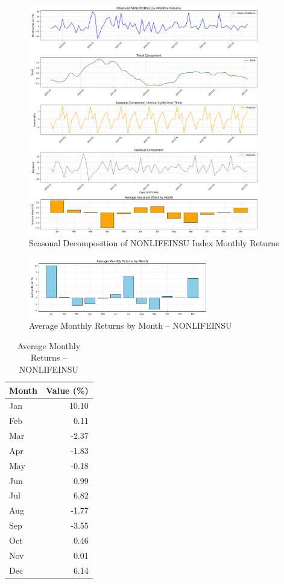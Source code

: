 \documentclass[12pt]{article}
\begin{document}
\begin{figure}[h!]
    \centering
    \includegraphics[width=0.9\textwidth]{decomposition_outputs/NONLIFEINSU_seasonal_decomposition.png}
    \caption{Seasonal Decomposition of NONLIFEINSU Index Monthly Returns}
\end{figure}

\begin{figure}[h!]
    \centering
    \includegraphics[width=0.7\textwidth]{decomposition_outputs/NONLIFEINSU_avg_monthly_returns.png}
    \caption{Average Monthly Returns by Month -- NONLIFEINSU}
\end{figure}

\begin{table}[h!]
\centering
\caption{Average Monthly Returns -- NONLIFEINSU}
\begin{tabular}{l r}
\toprule
Month & Value (\%) \\
\midrule
Jan & 10.10 \\
Feb & 0.11 \\
Mar & -2.37 \\
Apr & -1.83 \\
May & -0.18 \\
Jun & 0.99 \\
Jul & 6.82 \\
Aug & -1.77 \\
Sep & -3.55 \\
Oct & 0.46 \\
Nov & 0.01 \\
Dec & 6.14 \\
\bottomrule
\end{tabular}
\end{table}
\end{document}
